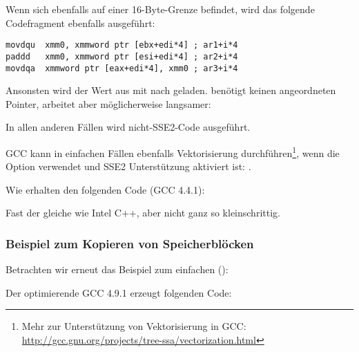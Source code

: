 Wenn sich  ebenfalls auf einer 16-Byte-Grenze befindet, wird das folgende Codefragment ebenfalls ausgeführt:

\begin{lstlisting}[style=customasmx86]
movdqu  xmm0, xmmword ptr [ebx+edi*4] ; ar1+i*4
paddd   xmm0, xmmword ptr [esi+edi*4] ; ar2+i*4
movdqa  xmmword ptr [eax+edi*4], xmm0 ; ar3+i*4
\end{lstlisting}
Ansonsten wird der Wert aus  mit \MOVDQU nach  geladen. \MOVDQU benötigt keinen angeordneten Pointer,
arbeitet aber möglicherweise langsamer:



In allen anderen Fällen wird nicht-SSE2-Code ausgeführt.


\newcommand{\URLGCCVEC}{\url{http://gcc.gnu.org/projects/tree-ssa/vectorization.html}}

GCC kann in einfachen Fällen ebenfalls Vektorisierung durchführen\footnote{Mehr zur Unterstützung von Vektorisierung in
GCC:
\URLGCCVEC}, wenn die Option \Othree verwendet und SSE2 Unterstützung aktiviert ist: .

Wie erhalten den folgenden Code (GCC 4.4.1):



Fast der gleiche wie Intel C++, aber nicht ganz so kleinschrittig.

\subsubsection{Beispiel zum Kopieren von Speicherblöcken}
\label{vec_memcpy}
Betrachten wir erneut das Beispiel zum einfachen ():



Der optimierende GCC 4.9.1 erzeugt folgenden Code:


